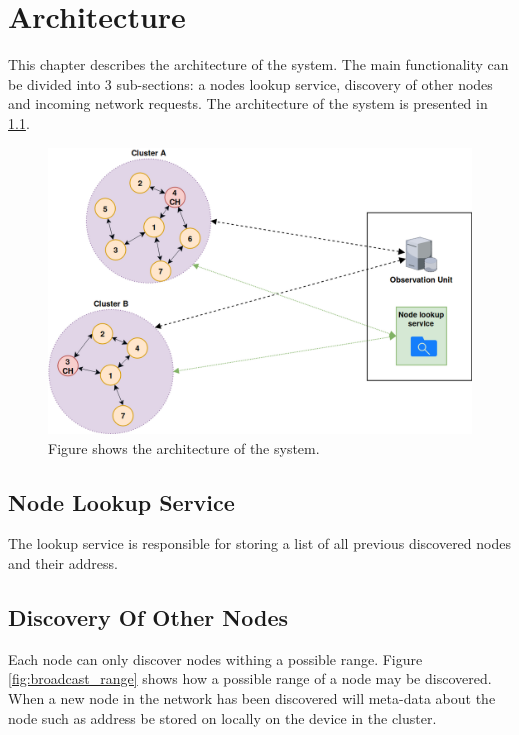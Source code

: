\documentclass[USenglish]{uit-thesis}
\begin{document}
\chapter{Architecture}

This chapter describes the architecture of the system. The main functionality can be divided into 3 sub-sections: a nodes lookup service, discovery of other nodes and incoming network requests. The architecture of the system is presented in \ref{fig:architecture}.

\begin{figure}
\centering
\includegraphics[width=\textwidth]{architecture.png}
\caption{Figure shows the architecture of the system.}
\label{fig:architecture}
\end{figure}


\section{Node Lookup Service} \label{sec:nodeLS}
The lookup service is responsible for storing a list of all previous discovered nodes and their address.

\section{Discovery Of Other Nodes} \label{sec:discON}
Each node can only discover nodes withing a possible range. Figure \ref{fig:broadcast_range} shows how a possible range of a node may be discovered. When a new node in the network has been discovered will meta-data about the node such as address be stored on locally on the device in the cluster.
\end{document}
